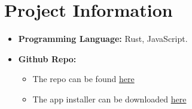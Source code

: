 \section{Project Information}
\begin{itemize}
  \item \textbf{Programming Language:} Rust, JavaScript.
  \item \textbf{Github Repo:}
  \begin{itemize}
    \item The repo can be found \href{https://github.com/yuran1811/hcmus-os--fat32}{here}
    \item The app installer can be downloaded \href{https://github.com/yuran1811/hcmus-os--fat32/releases}{here}
  \end{itemize}
\end{itemize}

